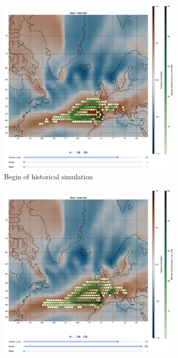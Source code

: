 \begin{figure}[!htb]
  \begin{subfigure}[b]{0.49\textwidth}
    \includegraphics[width=\textwidth]{figures/ivt_pr_cor_mode1_historical_hexbin.png}
    \caption{Begin of historical simulation}
    \label{fig:ivt eof pr cor historical mode1}
  \end{subfigure}
  \hfill
  \begin{subfigure}[b]{0.49\textwidth}
    \includegraphics[width=\textwidth]{figures/ivt_pr_cor_mode1_ssp126_hexbin.png}

\end{subfigure}
\end{figure}
